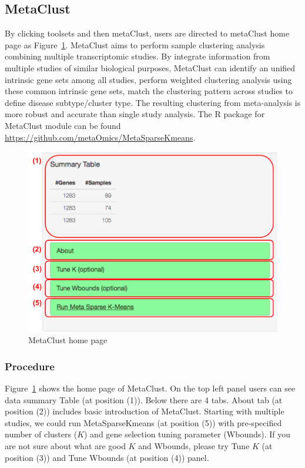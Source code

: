 \subsection{MetaClust}
By clicking toolsets and then metaClust,
users are directed to metaClust home page as Figure~\ref{fig:metaClustHome}.
MetaClust \citep{huo2016meta} aims to perform sample clustering analysis combining multiple transcriptomic studies.
By integrate information from multiple studies of similar biological purposes,
MetaClust can identify an unified intrinsic gene sets among all studies, perform weighted clustering analysis using these common intrinsic gene sets,
match the clustering pattern across studies to define disease subtype/cluster type.
The resulting clustering from meta-analysis is more robust and accurate than single study analysis.
The R package for MetaClust module can be found \url{https://github.com/metaOmics/MetaSparseKmeans}.


\begin{figure}[H]
\begin{center}
\includegraphics[scale=0.4]{./figure/metaClust/metaClustHome.pdf}
\caption{MetaClust home page}
\label{fig:metaClustHome}
\end{center}
\end{figure}

\subsubsection{Procedure}

Figure~\ref{fig:metaClustHome} shows the home page of MetaClust.
On the top left panel users can see data summary Table (at position {\color{red} (1)}).
Below there are 4 tabs. 
About tab (at position {\color{red} (2)}) includes basic introduction of MetaClust.
Starting with multiple studies, 
we could run MetaSparseKmeans (at position {\color{red} (5)}) with pre-specified number of clusters ($K$) and gene selection tuning parameter (Wbounds).
If you are not sure about what are good $K$ and Wbounds, please try Tune $K$ (at position {\color{red} (3)}) and Tune Wbounds (at position {\color{red} (4)}) panel.

